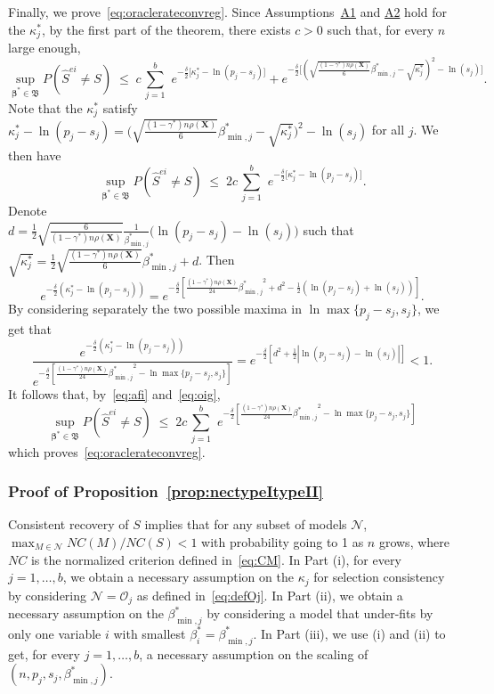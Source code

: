 \documentclass[
  12pt]{article}
\newcommand{\OO}{\mathcal{O}}
\newcommand{\bbeta}{\boldsymbol{\beta}}
\newcommand{\bX}{\mathbf{X}}
\newcommand{\bB}{\mathfrak{B}}
\begin{document}
Finally, we prove~\eqref{eq:oraclerateconvreg}. Since Assumptions~\hyperlink{lab:A1}{A1} and \hyperlink{lab:A2}{A2} hold for the $\kappa^*_j$, by the first part of the theorem, there exists $c>0$ such that, for every $n$ large enough,
\begin{equation*}
 \sup_{\bbeta^*\in \bB} P(\hat{S}^{ei} \neq S)\;\leq\; c\,\sum_{j=1}^b\,\, e^{-\tfrac{\delta}{2}\big[\kappa_j^*-\ln(p_j-s_j)\big]} + 
    e^{-\tfrac{\delta}{2}\big[(\sqrt{\frac{(1-\gamma^*) n\rho(\bX)}{6}}{\beta_{\min,j}^*} - \sqrt{\kappa_j^*})^2 -\ln(s_j) \big]}.
\end{equation*}
Note that the $\kappa_j^*$ satisfy $\kappa^*_j-\ln(p_j-s_j)=\big(\sqrt{\frac{(1-\gamma^*) n\rho(\bX)}{6}}{\beta_{\min,j}^*} - \sqrt{\kappa_j^*}\big)^2 -\ln(s_j)$ for all $j$. We then have
\begin{equation}\label{eq:afi}
 \sup_{\bbeta^*\in \bB}P(\hat{S}^{ei} \neq S)\;\leq\; 2c\,\sum_{j=1}^b\,\, e^{-\tfrac{\delta}{2}\big[\kappa_j^*-\ln(p_j-s_j)\big]}.
\end{equation}
Denote \\$d =\frac12\sqrt{\frac{6}{(1-\gamma^*) n\rho(\bX)}}\frac{1}{\beta_{\min,j}^*}\big(\ln({p_j-s_j})-\ln({s_j})\big)$ such that $\sqrt{\kappa^*_j}=  \frac12\sqrt{\frac{(1-\gamma^*) n\rho(\bX)}{6}}{\beta_{\min,j}^*} + d$. Then
$$e^{-\frac{\delta}{2}\left(\kappa^*_j-\ln(p_j-s_j)\right)}
=e^{-\frac{\delta}{2}\left[\frac{(1-\gamma^*) n\rho(\bX)}{24}{\beta_{\min,j}^*}^2+d^2 - \frac{1}{2}\left(\ln (p_j- s_j)+\ln (s_j)\right)\right]}.$$
By considering separately the two possible maxima in $\ln \max\{p_j-s_j,s_j\}$, we get that
\begin{equation}\label{eq:oig}
    \frac{e^{-\frac{\delta}{2}\left(\kappa^*_j-\ln(p_j-s_j)\right)}}{e^{-\frac{\delta}{2}\left[\frac{(1-\gamma^*) n\rho(\bX)}{24}{\beta_{\min,j}^*}^2-\ln \max\{p_j-s_j,s_j\}\right]}}= 
e^{-\frac{\delta}{2}\left[d^2 + \frac{1}{2}\left|\ln (p_j- s_j)-\ln (s_j)\right|\right]} <1.
\end{equation}
It follows that, by~\eqref{eq:afi} and~\eqref{eq:oig},
$$\sup_{\bbeta^*\in \bB} P(\hat{S}^{ei} \neq S) \; \leq \; 2c\,\sum_{j=1}^b\,\, e^{-\frac{\delta}{2}\left[\frac{(1-\gamma^*) n\rho(\bX)}{24}{\beta_{\min,j}^*}^2-\ln \max\{p_j-s_j,s_j\}\right]}$$
which proves~\eqref{eq:oraclerateconvreg}.

\subsubsection{Proof of Proposition~\ref{prop:nectypeItypeII}}
Consistent recovery of $S$ implies that for any subset of models $\mathcal{N}$, $\max_{M\in \mathcal{N}}NC(M)/NC(S)<1$ with probability going to 1 as $n$ grows, where $NC$ is the normalized criterion defined in~\eqref{eq:CM}. 
In Part (i), for every $j=1,\ldots,b$, we obtain a necessary assumption on the $\kappa_j$ for selection consistency by considering $\mathcal{N}=\OO_j$ as defined in~\eqref{eq:defOj}. In Part (ii), we obtain a necessary assumption on the $\beta_{\min,j}^*$ by considering a model that under-fits by only one variable $i$ with smallest $\beta^*_i=\beta_{\min,j}^*$. In Part (iii), we use (i) and (ii) to get, for every $j=1,\ldots,b$, a necessary assumption on the scaling of $(n,p_j,s_j,\beta_{\min,j}^*)$.
\end{document}
